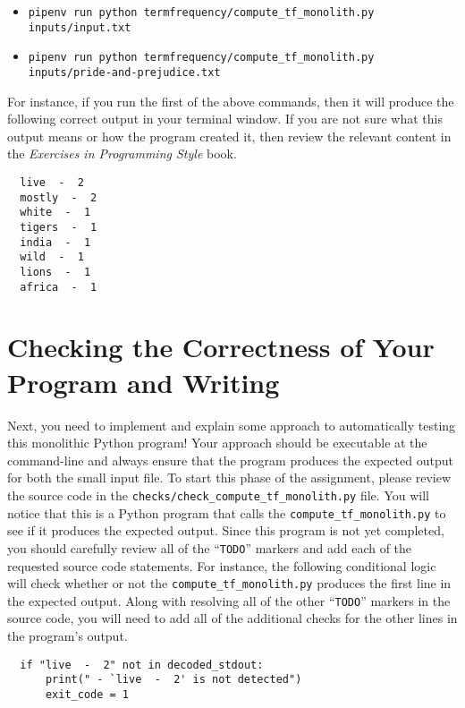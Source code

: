 \documentclass[11pt]{article}
\newcommand{\mainprogram}{\lstinline{compute_tf_monolith.py}}
\newcommand{\checkprogramsource}{\lstinline{checks/check_compute_tf_monolith.py}}
\newcommand{\programmingstyle}{{\em Exercises in Programming Style\/}}
\newcommand{\command}[1]{``\lstinline{#1}''}
\newcommand{\program}[1]{\lstinline{#1}}
\begin{document}
\begin{itemize}

  \item \program{pipenv run python termfrequency/compute_tf_monolith.py inputs/input.txt}
  \item \program{pipenv run python termfrequency/compute_tf_monolith.py inputs/pride-and-prejudice.txt}

\end{itemize}

\vspace*{-.2in}

For instance, if you run the first of the above commands, then it will produce
the following correct output in your terminal window. If you are not sure what
this output means or how the program created it, then review the relevant
content in the \programmingstyle{} book.

\vspace*{-.1in}

\begin{verbatim}
  live  -  2
  mostly  -  2
  white  -  1
  tigers  -  1
  india  -  1
  wild  -  1
  lions  -  1
  africa  -  1
\end{verbatim}

\section*{Checking the Correctness of Your Program and Writing}

Next, you need to implement and explain some approach to automatically testing
this monolithic Python program! Your approach should be executable at the
command-line and always ensure that the program produces the expected output for
both the small input file. To start this phase of the assignment, please review
the source code in the \checkprogramsource{} file. You will notice that this is
a Python program that calls the \mainprogram{} to see if it produces the
expected output. Since this program is not yet completed, you should carefully
review all of the \command{TODO} markers and add each of the requested source
code statements.
%
For instance, the following conditional logic will check whether or not the
\mainprogram{} produces the first line in the expected output. Along with
resolving all of the other \command{TODO} markers in the source code, you will
need to add all of the additional checks for the other lines in the program's
output.

\begin{verbatim}
  if "live  -  2" not in decoded_stdout:
      print(" - `live  -  2' is not detected")
      exit_code = 1
\end{verbatim}
\end{document}

